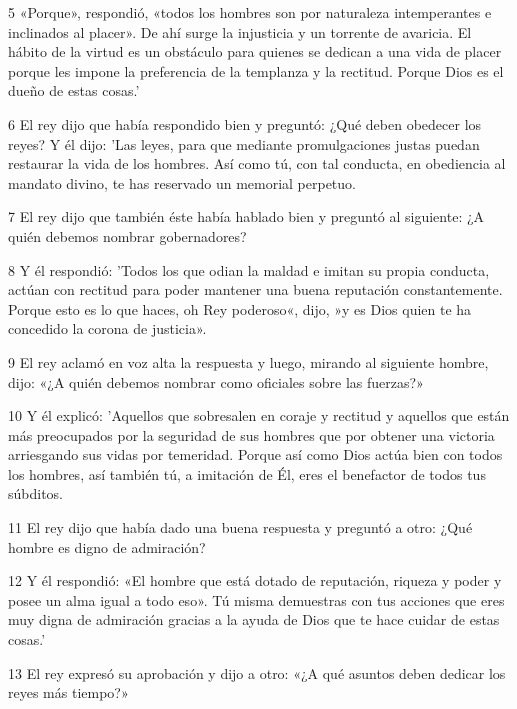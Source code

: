 \par 5 «Porque», respondió, «todos los hombres son por naturaleza intemperantes e inclinados al placer». De ahí surge la injusticia y un torrente de avaricia. El hábito de la virtud es un obstáculo para quienes se dedican a una vida de placer porque les impone la preferencia de la templanza y la rectitud. Porque Dios es el dueño de estas cosas.'

\par 6 El rey dijo que había respondido bien y preguntó: ¿Qué deben obedecer los reyes? Y él dijo: 'Las leyes, para que mediante promulgaciones justas puedan restaurar la vida de los hombres. Así como tú, con tal conducta, en obediencia al mandato divino, te has reservado un memorial perpetuo.

\par 7 El rey dijo que también éste había hablado bien y preguntó al siguiente: ¿A quién debemos nombrar gobernadores?

\par 8 Y él respondió: 'Todos los que odian la maldad e imitan su propia conducta, actúan con rectitud para poder mantener una buena reputación constantemente. Porque esto es lo que haces, oh Rey poderoso«, dijo, »y es Dios quien te ha concedido la corona de justicia».

\par 9 El rey aclamó en voz alta la respuesta y luego, mirando al siguiente hombre, dijo: «¿A quién debemos nombrar como oficiales sobre las fuerzas?»

\par 10 Y él explicó: 'Aquellos que sobresalen en coraje y rectitud y aquellos que están más preocupados por la seguridad de sus hombres que por obtener una victoria arriesgando sus vidas por temeridad. Porque así como Dios actúa bien con todos los hombres, así también tú, a imitación de Él, eres el benefactor de todos tus súbditos.

\par 11 El rey dijo que había dado una buena respuesta y preguntó a otro: ¿Qué hombre es digno de admiración?

\par 12 Y él respondió: «El hombre que está dotado de reputación, riqueza y poder y posee un alma igual a todo eso». Tú misma demuestras con tus acciones que eres muy digna de admiración gracias a la ayuda de Dios que te hace cuidar de estas cosas.'

\par 13 El rey expresó su aprobación y dijo a otro: «¿A qué asuntos deben dedicar los reyes más tiempo?»


